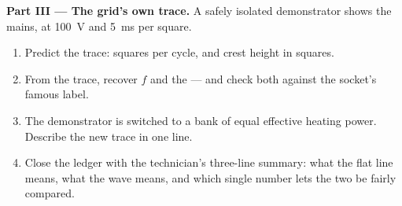 \begin{problem}
\medskip\noindent\textbf{Part III --- The grid's own
trace.}
A safely isolated demonstrator shows the mains, at
\qty{100}{V} and \qty{5}{ms} per square.
\begin{enumerate}[resume]
  \item Predict the trace: squares per cycle, and crest
        height in squares.
  \item From the trace, recover $f$ and the  --- and check both against the socket's
        famous label.
  \item The demonstrator is switched to a  bank of
        equal effective heating power. Describe the new
        trace in one line.
  \item Close the ledger with the technician's three-line
        summary: what the flat line means, what the wave
        means, and which single number lets the two be
        fairly compared.
\end{enumerate}
\end{problem}
